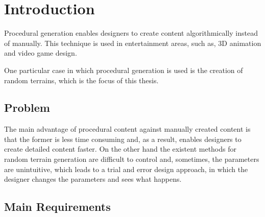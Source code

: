 \chapter{Introduction}

Procedural generation enables designers to create content algorithmically instead of manually. This technique is used in entertainment areas, such as, 3D animation and video game design.

One particular case in which procedural generation is used is the creation of random terrains, which is the focus of this thesis.


\section {Problem}

The main advantage of procedural content against manually created content is that the former is less time consuming and, as a result, enables designers to create detailed content faster. On the other hand the existent methods for random terrain generation are difficult to control and, sometimes, the parameters are unintuitive, which leads to a trial and error design approach, in which the designer changes the parameters and sees what happens.


\section{Main Requirements}

